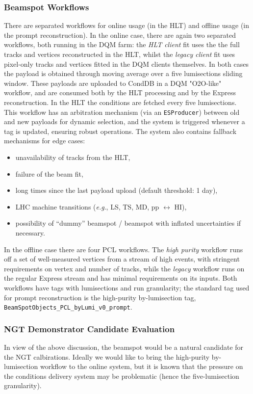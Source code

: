 \subsubsection{Beamspot Workflows}

There are separated workflows for
online usage (in the HLT) and
offline usage (in the prompt reconstruction).
In the online case, there are again two separated workflows, both running in the DQM farm:
the \emph{HLT client} fit uses the the full tracks and vertices reconstructed in the HLT, whilst
the \emph{legacy client} fit uses pixel-only tracks and vertices fitted in the DQM clients themselves.
In both cases the payload is obtained through moving average over a five lumisections sliding window.
These payloads are uploaded to CondDB in a DQM "O2O-like" workflow,
and
are consumed both by the HLT processing and by the Express reconstruction.
In the HLT the conditions are fetched every five lumisections.
This workflow has an arbitration mechanism (via an \texttt{ESProducer}) between old and new payloads for dynamic selection, and the system is triggered whenever a tag is updated, ensuring robust operations.
The system also contains fallback mechanisms for edge cases:
\begin{itemize}
\item unavailability of tracks from the HLT,
\item failure of the beam fit,
\item long times since the last payload upload (default threshold: 1 day),
\item LHC machine transitions (\textit{e.g}., LS, TS, MD, pp $\leftrightarrow$ HI),
\item possibility of ``dummy'' beamspot / beamspot with inflated uncertainties if necessary.
\end{itemize}
In the offline case there are four PCL workflows.
The \emph{high purity} workflow runs off a set of well-measured vertices from a stream of high \HT events,
with stringent requirements on vertex \PT and number of tracks, whils
the \emph{legacy} workflow runs on the regular Express stream and has minimal requirements on its inputs.
Both workflows have tags with lumisections and run granularity;
the standard tag used for prompt reconstruction is the high-purity by-lumisection tag, \texttt{BeamSpotObjects\_PCL\_byLumi\_v0\_prompt}.

\subsubsection{NGT Demonstrator Candidate Evaluation}
In view of the above discussion, the beamspot would be a natural candidate for the NGT calbirations.
Ideally we would like to bring the high-purity by-lumisection workflow to the online system,
but it is known that the pressure on the conditions delivery system may be problematic (hence the five-lumisection granularity).


